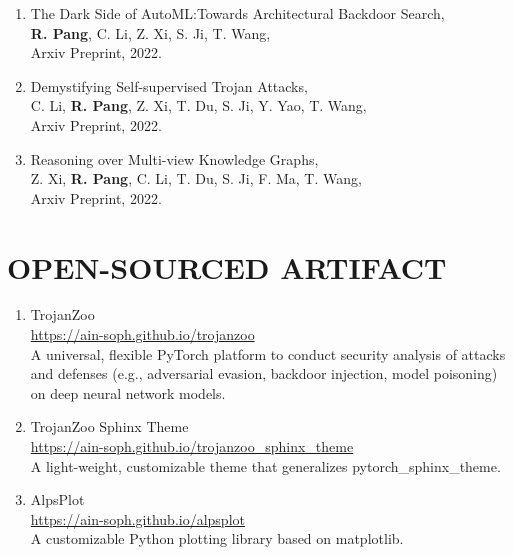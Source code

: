 \documentclass[letterpaper,11pt]{article}
\begin{document}
\begin{enumerate}[labelsep=15pt, parsep=-4pt]
    \item The Dark Side of AutoML:\@ Towards Architectural Backdoor Search,\\
    \textbf{R. Pang}, C. Li, Z. Xi, S. Ji, T. Wang,\\
    Arxiv Preprint, 2022.
    
    \item Demystifying Self-supervised Trojan Attacks,\\
    C. Li, \textbf{R. Pang}, Z. Xi, T. Du, S. Ji, Y. Yao, T. Wang,\\
    Arxiv Preprint, 2022.
    
    \item Reasoning over Multi-view Knowledge Graphs,\\
    Z. Xi, \textbf{R. Pang}, C. Li, T. Du, S. Ji, F. Ma, T. Wang,\\
    Arxiv Preprint, 2022.
    
    \end{enumerate}
    

\section{OPEN-SOURCED ARTIFACT}

\begin{enumerate}[labelsep=15pt, parsep=4pt]

    \item TrojanZoo\\
    \url{https://ain-soph.github.io/trojanzoo} \\
    A universal, flexible PyTorch platform to conduct security analysis of attacks and defenses (e.g., adversarial evasion, backdoor injection, model poisoning) on deep neural network models. 
    
    \item TrojanZoo Sphinx Theme \\
    \url{https://ain-soph.github.io/trojanzoo_sphinx_theme} \\
    A light-weight, customizable theme that generalizes pytorch\_sphinx\_theme.
    
    \item AlpsPlot \\
    \url{https://ain-soph.github.io/alpsplot} \\
    A customizable Python plotting library based on matplotlib.

\end{enumerate}
\end{document}
